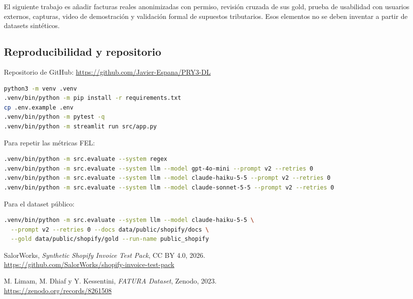 \documentclass[11pt,a4paper]{article}
\begin{document}
El siguiente trabajo es añadir facturas reales anonimizadas con permiso, revisión cruzada de sus gold, prueba de usabilidad con usuarios externos, capturas, video de demostración y validación formal de supuestos tributarios. Esos elementos no se deben inventar a partir de datasets sintéticos.

\subsection{Reproducibilidad y repositorio}
Repositorio de GitHub: \url{https://github.com/Javier-Espana/PRY3-DL}

\begin{lstlisting}[language=bash]
python3 -m venv .venv
.venv/bin/python -m pip install -r requirements.txt
cp .env.example .env
.venv/bin/python -m pytest -q
.venv/bin/python -m streamlit run src/app.py
\end{lstlisting}

Para repetir las métricas FEL:
\begin{lstlisting}[language=bash]
.venv/bin/python -m src.evaluate --system regex
.venv/bin/python -m src.evaluate --system llm --model gpt-4o-mini --prompt v2 --retries 0
.venv/bin/python -m src.evaluate --system llm --model claude-haiku-5-5 --prompt v2 --retries 0
.venv/bin/python -m src.evaluate --system llm --model claude-sonnet-5-5 --prompt v2 --retries 0
\end{lstlisting}

Para el dataset público:
\begin{lstlisting}[language=bash]
.venv/bin/python -m src.evaluate --system llm --model claude-haiku-5-5 \
  --prompt v2 --retries 0 --docs data/public/shopify/docs \
  --gold data/public/shopify/gold --run-name public_shopify
\end{lstlisting}

\begin{thebibliography}{9}
SalorWorks, \emph{Synthetic Shopify Invoice Test Pack}, CC BY 4.0, 2026.\\
\url{https://github.com/SalorWorks/shopify-invoice-test-pack}

M. Limam, M. Dhiaf y Y. Kessentini, \emph{FATURA Dataset}, Zenodo, 2023.\\
\url{https://zenodo.org/records/8261508}
\end{thebibliography}
\end{document}
